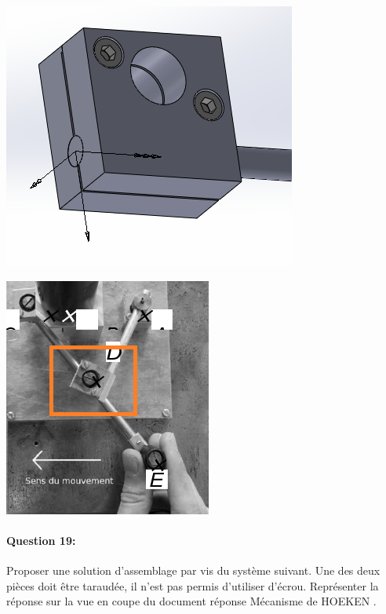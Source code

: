 \begin{minipage}{0.45\linewidth}
	\includegraphics[width=0.7\linewidth]{img/Figure20}
\end{minipage}\hfill
\begin{minipage}{0.45\linewidth}
	\includegraphics[width=0.7\linewidth]{img/Figure21}
\end{minipage}

\paragraph{Question 19:} Proposer une solution d'assemblage par vis du système suivant. Une des deux pièces doit être taraudée, il n'est pas permis d'utiliser d'écrou. Représenter la réponse sur la vue en coupe du document réponse \og Mécanisme de HOEKEN \fg.


